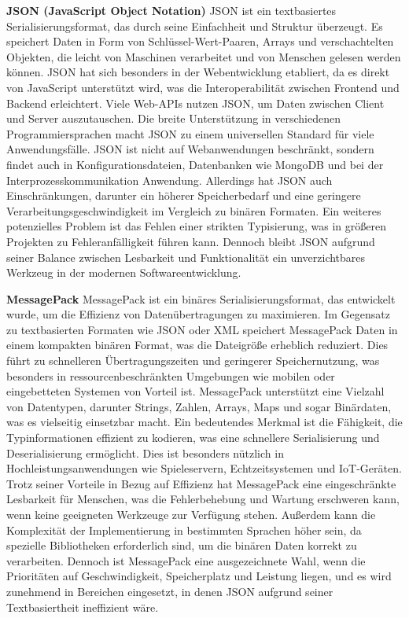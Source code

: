 \documentclass[ngerman]{seminarvorlage}
\begin{document}
\textbf{JSON (JavaScript Object Notation)} \cite{rfc8259}
JSON ist ein textbasiertes Serialisierungsformat, das durch seine Einfachheit und Struktur überzeugt. Es speichert Daten in Form von Schlüssel-Wert-Paaren, Arrays und verschachtelten Objekten, die leicht von Maschinen verarbeitet und von Menschen gelesen werden können. JSON hat sich besonders in der Webentwicklung etabliert, da es direkt von JavaScript unterstützt wird, was die Interoperabilität zwischen Frontend und Backend erleichtert. Viele Web-APIs nutzen JSON, um Daten zwischen Client und Server auszutauschen. Die breite Unterstützung in verschiedenen Programmiersprachen macht JSON zu einem universellen Standard für viele Anwendungsfälle. JSON ist nicht auf Webanwendungen beschränkt, sondern findet auch in Konfigurationsdateien, Datenbanken wie MongoDB und bei der Interprozesskommunikation Anwendung. Allerdings hat JSON auch Einschränkungen, darunter ein höherer Speicherbedarf und eine geringere Verarbeitungsgeschwindigkeit im Vergleich zu binären Formaten. Ein weiteres potenzielles Problem ist das Fehlen einer strikten Typisierung, was in größeren Projekten zu Fehleranfälligkeit führen kann. Dennoch bleibt JSON aufgrund seiner Balance zwischen Lesbarkeit und Funktionalität ein unverzichtbares Werkzeug in der modernen Softwareentwicklung.

\textbf{MessagePack} \cite{msgpack}
MessagePack ist ein binäres Serialisierungsformat, das entwickelt wurde, um die Effizienz von Datenübertragungen zu maximieren. Im Gegensatz zu textbasierten Formaten wie JSON oder XML speichert MessagePack Daten in einem kompakten binären Format, was die Dateigröße erheblich reduziert. Dies führt zu schnelleren Übertragungszeiten und geringerer Speichernutzung, was besonders in ressourcenbeschränkten Umgebungen wie mobilen oder eingebetteten Systemen von Vorteil ist. MessagePack unterstützt eine Vielzahl von Datentypen, darunter Strings, Zahlen, Arrays, Maps und sogar Binärdaten, was es vielseitig einsetzbar macht. Ein bedeutendes Merkmal ist die Fähigkeit, die Typinformationen effizient zu kodieren, was eine schnellere Serialisierung und Deserialisierung ermöglicht. Dies ist besonders nützlich in Hochleistungsanwendungen wie Spieleservern, Echtzeitsystemen und IoT-Geräten. Trotz seiner Vorteile in Bezug auf Effizienz hat MessagePack eine eingeschränkte Lesbarkeit für Menschen, was die Fehlerbehebung und Wartung erschweren kann, wenn keine geeigneten Werkzeuge zur Verfügung stehen. Außerdem kann die Komplexität der Implementierung in bestimmten Sprachen höher sein, da spezielle Bibliotheken erforderlich sind, um die binären Daten korrekt zu verarbeiten. Dennoch ist MessagePack eine ausgezeichnete Wahl, wenn die Prioritäten auf Geschwindigkeit, Speicherplatz und Leistung liegen, und es wird zunehmend in Bereichen eingesetzt, in denen JSON aufgrund seiner Textbasiertheit ineffizient wäre.
\end{document}
